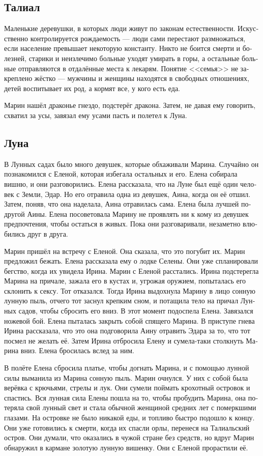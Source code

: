 \documentclass[a4paper,12pt,fleqn]{book}\usepackage{polyglossia}\setdefaultlanguage[babelshorthands=true]{russian}\setotherlanguage{english}\defaultfontfeatures{Ligatures=TeX,Mapping=tex-text}\usepackage{xcolor}\newcommand{\ml}[3]{#2}
\begin{document}
{\subsection{Талиал}

Маленькие деревушки, в которых люди живут по законам естественности.
Искусственно контролируется рождаемость --- люди сами перестают размножаться, если население превышает некоторую константу.
Никто не боится смерти и болезней, старики и неизлечимо больные уходят умирать в горы, а остальные больные отправляются в отдалённые места к лекарям.
Понятие <<семья>> не закреплено жёстко --- мужчины и женщины находятся в свободных отношениях, детей воспитывает их род, а кормят все, у кого есть еда. 

Марин нашёл драконье гнездо, подстерёг дракона.
Затем, не давая ему говорить, схватил за усы, завязал ему усами пасть и полетел к Луна.

\subsection{Луна}

В Лунных садах было много девушек, которые обхаживали Марина.
Случайно он познакомился с Еленой, которая избегала остальных и его.
Елена собирала вишню, и они разговорились.
Елена рассказала, что на Луне был ещё один человек с Земли, Эдар.
Но его отравила одна из девушек, Аина, когда он её отшил.
Затем, поняв, что она наделала, Аина отравилась сама.
Елена была лучшей подругой Аины.
Елена посоветовала Марину не проявлять ни к кому из девушек предпочтения, чтобы остаться в живых.
Пока они разговаривали, незаметно влюбились друг в друга.

Марин пришёл на встречу с Еленой.
Она сказала, что это погубит их.
Марин предложил бежать.
Елена рассказала ему о лодке Селены.
Они уже спланировали бегство, когда их увидела Ирина.
Марин с Еленой расстались.
Ирина подстерегла Марина на причале, зажала его в кустах и, угрожая оружием, попыталась его склонить к сексу.
Тот отказался.
Тогда Ирина выдохнула Марину в лицо сонную лунную пыль, отчего тот заснул крепким сном, и потащила тело на причал Лунных садов, чтобы сбросить его вниз.
В этот момент подоспела Елена.
Завязался ножевой бой.
Елена пыталась закрыть собой спящего Марина.
В приступе гнева Ирина рассказала, что это она подговорила Аину отравить Эдара за то, что тот посмел не желать её.
Затем Ирина отбросила Елену и сумела-таки столкнуть Марина вниз.
Елена бросилась вслед за ним.

В полёте Елена сбросила платье, чтобы догнать Марина, и с помощью лунной силы выманила из Марина сонную пыль.
Марин очнулся.
У них с собой была верёвка с крючьями, стрелы и лук.
Они сумели поймать крохотный островок и спастись.
Вся лунная сила Елены пошла на то, чтобы пробудить Марина, она потеряла свой лунный свет и стала обычной женщиной средних лет с померкшими глазами.
На островке не было никакой еды, и топливо быстро подошло к концу.
Они уже готовились к смерти, когда их спасли орлы, перенеся на Талиальский остров.
Они думали, что оказались в чужой стране без средств, но вдруг Марин обнаружил в кармане золотую лунную вишенку.
Они с Еленой прорастили её.

}
\end{document}
